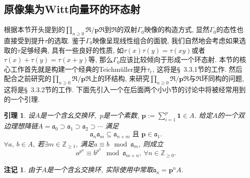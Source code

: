 \documentclass[UTF8, twoside]{ctexart}
\theoremstyle{nonumberplain}
\theoremstyle{nonumberplain}
\newtheorem{zhuji}{\heiti 注记}  %
\theoremstyle{plain}
\newtheorem{yinli}[dingyi]{引理}
\begin{document}
	\subsection{原像集为Witt向量环的环态射}
	根据本节开头提到的$\prod_{n\ge 0}^{{}}{\Re /\bm{p}\Re }$到$\Re $的双射$\Gamma_0 $映像的构造方式, 显然$\Gamma_0$的态性也直接受到提升$\tau $的选取. 鉴于$\Gamma_0$映像呈现线性组合的面貌, 我们自然地会考虑如果选取的$\tau $足够经典, 具有一些良好的性质, 如$\tau \left( x \right)\tau \left( y \right)=\tau \left( xy \right)$或者$\tau \left( x \right)+\tau \left( y \right)=\tau \left( x+y \right)$等, 那么$\Gamma_0$应该比较倾向于形成一个环态射. 本节的核心工作首先就是构建一个经典的Teichmüller提升$\tau_e $,
	这将是\S~3.3.1节的工作. 
	 然后配合之前研究的$\prod_{n\ge 0}^{{}}{\Re /\bm{p}\Re }$上的环结构, 来研究$\prod_{n\ge 0}^{{}}{\Re /\bm{p}\Re }$与$\Re $环同构的问题, 
	 这将是\S~3.3.2节的工作. 
	下面先引入一个在后面两个小小节的讨论中将被经常用到的一个引理.
	\begin{yinli} \label{引理10.9.3}
		设$A$是一个含幺交换环,\ $p$是一个素数, $\bm{p}:=\sum_{i=1}^{p}{\bm{1}\in A}$. 给定$A$的一个双边理想降链$A ={{\mathfrak{a}}_{0}}\supset {{\mathfrak{a}}_{1}}\supset {{\mathfrak{a}}_{2}}\supset \cdots $
		满足
		\[
		{{\mathfrak{a}}_{n}}{{\mathfrak{a}}_{m}}\subseteq {{\mathfrak{a}}_{n+m}}\text{\ 且\ }\bm{p}\in {{\mathfrak{a}}_{1}}.
		\]
		$\forall a,\ b\in A$, 若$\exists m\in {{\mathbb{Z}}_{\ge 1}}$, 满足$a\equiv b
		\ \bmod {{\mathfrak{a}}_{m}}$, 则成立
		\[
			{{a}^{{{p}^{n}}}}\equiv {{b}^{{{p}^{n}}}}\ \bmod {{\mathfrak{a}}_{m+n}},\ \forall n\in {{\mathbb{Z}}_{\ge 0}}.
		\]
	\end{yinli}
	\begin{zhuji}
		由于$A$是一个含幺交换环, 实际使用中常取${{\mathfrak{a}}_{n}}=
			{\bm{p}^{n}}A$.
	\end{zhuji}
\end{document}
